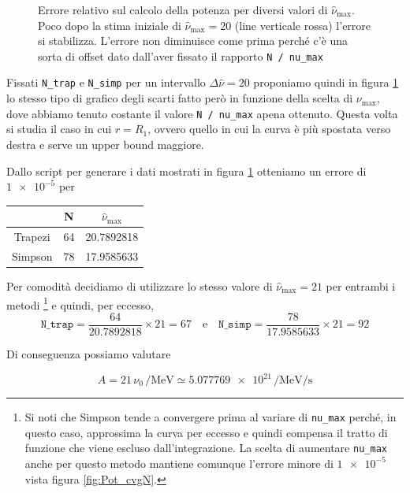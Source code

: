 \documentclass[a4paper, titlepage]{article}
\begin{document}
\begin{figure}[h]
\begin{minipage}{0.49 \textwidth}
        \caption{Errore relativo sul calcolo della potenza per diversi valori di $\hat \nu_\text{max}$.
        Poco dopo la stima iniziale di  $\hat \nu_\text{max} = \num{20}$ (line verticale rossa) l'errore si stabilizza. L'errore non diminuisce come prima perché c'è una sorta di offset dato dall'aver fissato il rapporto \texttt{N / nu\_max}}
        \label{fig:Pot_cvgA}
    \end{minipage}
\end{figure}

Fissati \texttt{N\_trap} e \texttt{N\_simp} per un intervallo $\Delta \hat \nu = 20$ proponiamo quindi in figura \ref{fig:Pot_cvgA} lo stesso tipo di grafico degli scarti fatto però in funzione della scelta di $\nu_\text{max}$, dove abbiamo tenuto costante il valore \texttt{N / nu\_max} apena ottenuto.
Questa volta si studia il caso in cui $r = R_1$, ovvero quello in cui la curva è più spostata verso destra e serve un upper bound maggiore.

Dallo script per generare i dati mostrati in figura \ref{fig:Pot_cvgA} otteniamo un errore di $\num{1e-5}$ per

\begin{table}[h]
    \centering
    \begin{tabular}{ccc}
         & N & $\hat \nu_\text{max}$ \\
        \hline
        Trapezi & 64 & 20.7892818 \\
        \hline
        Simpson & 78 & 17.9585633 \\
    \end{tabular}
\end{table}

Per comodità decidiamo di utilizzare lo stesso valore di $\hat \nu_\text{max} = 21$ per entrambi i metodi 
\footnote{Si noti che Simpson tende a convergere prima al variare di \texttt{nu\_max} perché, in questo caso, approssima la curva per eccesso e quindi compensa il tratto di funzione che viene escluso dall'integrazione.
La scelta di aumentare \texttt{nu\_max} anche per questo metodo mantiene comunque l'errore minore di $\num{1e-5}$ vista figura \ref{fig:Pot_cvgN}.}
e quindi, per eccesso, 
\begin{equation}
    \texttt{N\_trap} = \frac{64}{20.7892818} \times 21 = 67
    \quad \text{e} \quad
    \texttt{N\_simp} = \frac{78}{17.9585633} \times 21 = 92
\end{equation}

Di conseguenza possiamo valutare

\begin{equation}
    A = 21 \, \nu_0 \, \unit{\per\mega\electronvolt} \simeq \num{5.077769e21} \, \unit{\per\mega\electronvolt\per\second}
    \label{eq:A_giusto}
\end{equation}
\end{document}
